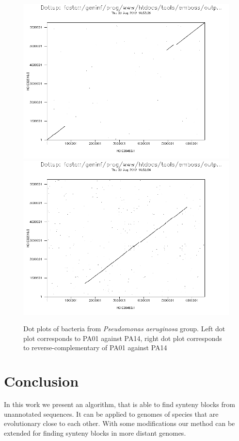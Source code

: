 \documentclass[a4paper, 12pt]{scrartcl}
\begin{document}
\begin{figure}
\centering
\includegraphics[scale = 0.30]{PA01POS_PA14POS.png}
\includegraphics[scale = 0.30]{PA01NEG_PA14POS.png}
\small \caption{Dot plots of bacteria from \textit{Pseudomonas aeruginosa} group. Left dot plot corresponds to PA01 against PA14, right dot plot corresponds to reverse-complementary of PA01 against PA14}
\label{DotPlot}
\end{figure}


\section{Conclusion}
In this work we present an algorithm, that is able to find synteny blocks from unannotated sequences. It can be applied to genomes of species that are evolutionary close to each other.
With some modifications our method can be extended for finding synteny blocks in more distant genomes.
\end{document}
